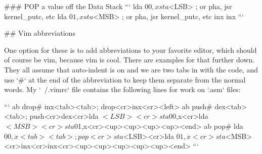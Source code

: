 ### POP a value off the Data Stack
```
                lda $00,x
                sta $<LSB>      ; or pha, jsr kernel_putc, etc
                lda $01,x
                sta $<MSB>      ; or pha, jsr kernel_putc, etc
                inx
                inx
```

## Vim abbreviations

One option for these is to add abbreviations to your favorite editor, which
should of course be vim, because vim is cool. There are examples for
that further down. They all assume that auto-indent is on and we are
two tabs in with the code, and use `#` at the end of the abbreviation
to keep them separate from the normal words. My `~/.vimrc` file contains
the following lines for work on `.asm` files:

```
ab drop# inx<tab><tab>; drop<cr>inx<cr><left>
ab push# dex<tab><tab>; push<cr>dex<cr>lda $<LSB><cr>sta $00,x<cr>lda $<MSB><cr>sta $01,x<cr><up><up><up><up><end>
ab pop# lda $00,x<tab><tab>; pop<cr>sta $<LSB><cr>lda $01,x<cr>sta $<MSB><cr>inx<cr>inx<cr><up><up><up><up><up><end>
```


